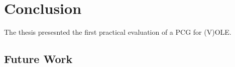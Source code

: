 \chapter{Conclusion}
The thesis presesnted the first practical evaluation of a PCG for (V)OLE. 

\section{Future Work}

